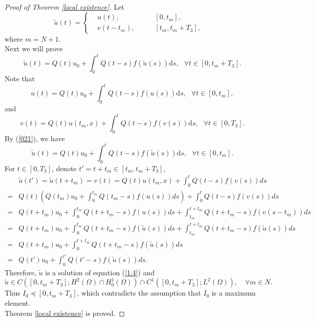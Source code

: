 \documentclass{article}
\numberwithin{equation}{section}
\begin{document}
\begin{proof}[Proof of Theorem \ref{local existence}]
Let
\begin{equation}
\widetilde{u}(t)=\left\{\begin{aligned}
& u(t),\qquad &[0, t_m],
\\ & v(t-t_m),\qquad &[t_m, t_m+T_3],
\end{aligned}\quad \right. \label{021}
\end{equation}
where $m=N+1$.\\
Next we will prove
\begin{equation}
	\widetilde{u}(t)=Q(t) u_{0}+\int_{0}^{t} Q(t-s) f(\widetilde{u}(s)) \mathrm{d} s,\text{ }\forall t\in[0, t_m+T_3].\label{022}
\end{equation}
Note that
\begin{equation}
u(t)=Q(t) u_{0}+\int_{0}^{t} Q(t-s) f(u(s)) \mathrm{d} s,\text{ }\forall t\in[0, t_m],
\label{023}
\end{equation}
and
\begin{equation}
v(t)=Q(t) u(t_m, x)+\int_{0}^{t} Q(t-s) f(v(s)) \mathrm{d}s ,\text{ }\forall  t\in[0, T_3].\label{024}
\end{equation}
By (\ref{021}), we have
\begin{equation}
	\widetilde{u}(t)=Q(t) u_{0}+\int_{0}^{t} Q(t-s) f(\widetilde{u}(s)) \mathrm{d} s,\text{ }\forall  t\in[0, t_m].\label{025}
\end{equation}
For $t\in [0, T_3]$, denote $t'=t+t_m\in [t_m, t_m+T_3]$,
\begin{equation}
	\begin{aligned}
	& \widetilde{u}\left(t'\right)=\widetilde{u}\left(t+t_{m}\right)=v(t)=Q(t) u\left(t_{m}, x\right)+\int_{0}^{t} Q(t-s) f(v(s)) d s
\\=& Q(t)\left(Q\left(t_{m}\right) u_{0}+\int_{0}^{t_{m}} Q\left(t_{m}-s\right) f(u(s)) d s\right)+\int_{0}^{t} Q(t-s) f(v(s)) d s \\=& Q\left(t+t_{m}\right) u_{0}+\int_{0}^{t_{m}} Q\left(t+t_{m}-s\right) f(u(s)) d s +\int_{t_{m}}^{t+t_{m}} Q\left(t+t_{m}-s\right) f\left(v\left(s-t_{m}\right)\right) d s
\\=& Q\left(t+t_{m}\right) u_{0}+\int_{0}^{t_{m}} Q\left(t+t_{m}-s\right) f(\widetilde{u}(s)) d s +\int_{t_{m}}^{t+t_{m}} Q\left(t+t_{m}-s\right) f(\widetilde{u}(s)) d s
\\=& Q\left(t+t_{m}\right) u_{0}+\int_{0}^{t+t_{m}} Q\left(t+t_{m}-s\right) f(\widetilde{u}(s)) d s
\\=& Q\left(t'\right) u_{0}+\int_{0}^{t'} Q\left(t'-s\right) f(\widetilde{u}(s)) d s.
	\end{aligned}\label{026}
\end{equation}
Therefore, $\widetilde{u}$ is a solution of equation (\ref{1.4}) and
$$\widetilde{u} \in C\left([0, t_m+T_3]; H^{2}(\Omega) \cap H_{0}^{1}(\Omega)\right) \cap C^{1}\left([0, t_m+T_3];  L^{2}(\Omega)\right),\quad\forall m\in N. $$
Thus $I_0\preceq [0, t_m+T_3]$, which contradicts the assumption that $I_0$ is a maximum element.\\
Theorem \ref{local existence} is proved.
\end{proof}
\end{document}
